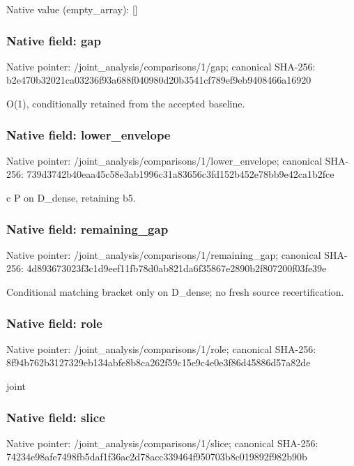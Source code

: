 \documentclass[10pt,a4paper]{article}
\begin{document}
Native value (empty\_\allowbreak{}array): []

\subsubsection{Native field: gap}
Native pointer: /joint\_\allowbreak{}analysis/comparisons/1/gap; canonical SHA-256: b2e470b32021ca03236f93a688f040980d20b3541cf789ef9eb9408466a16920

\begingroup\raggedright\sloppy O(1),\allowbreak{} conditionally retained from the accepted baseline.\par\endgroup

\subsubsection{Native field: lower\_\allowbreak{}envelope}
Native pointer: /joint\_\allowbreak{}analysis/comparisons/1/lower\_\allowbreak{}envelope; canonical SHA-256: 739d3742b40eaa45c58e3ab1996c31a83656c3fd152b452e78bb9e42ca1b2fce

\begingroup\raggedright\sloppy c P on D\_\allowbreak{}dense,\allowbreak{} retaining b5.\par\endgroup

\subsubsection{Native field: remaining\_\allowbreak{}gap}
Native pointer: /joint\_\allowbreak{}analysis/comparisons/1/remaining\_\allowbreak{}gap; canonical SHA-256: 4d893673023f3c1d9eef11fb78d0ab821da6f35867e2890b2f807200f03fe39e

\begingroup\raggedright\sloppy Conditional matching bracket only on D\_\allowbreak{}dense;\allowbreak{} no fresh source recertification.\par\endgroup

\subsubsection{Native field: role}
Native pointer: /joint\_\allowbreak{}analysis/comparisons/1/role; canonical SHA-256: 8f94b762b3127329eb134abfe8b8ca262f59c15e9c4e0e3f86d45886d57a82de

\begingroup\raggedright\sloppy joint\par\endgroup

\subsubsection{Native field: slice}
Native pointer: /joint\_\allowbreak{}analysis/comparisons/1/slice; canonical SHA-256: 74234e98afe7498fb5daf1f36ac2d78acc339464f950703b8c019892f982b90b
\end{document}
